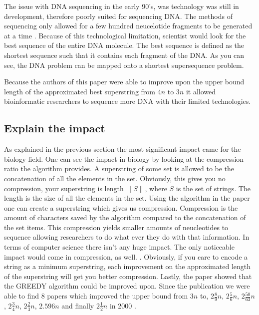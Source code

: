 \documentclass[letterpaper,11pt,titlepage]{article}
\begin{document}
The issue with DNA sequencing in the early 90's, was technology was still in development, therefore poorly suited for sequencing DNA. The methods of sequencing only allowed for a few hundred neucelotide fragments to be generated at a time \cite{karp1993mapping}. Because of this technological limitation, scientist would look for the best sequence of the entire DNA molecule. The best sequence is defined as the shortest sequence such that it contains each fragment of the DNA. As you can see, the DNA problem can be mapped onto a shortest supersequence problem. 

Because the authors of this paper were able to improve upon the upper bound length of the approximated best superstring from $4n$ to $3n$ it allowed bioinformatic researchers to sequence more DNA with their limited technologies. 



\subsection*{Explain the impact}
As explained in the previous section the most significant impact came for the biology field. One can see the impact in biology by looking at the compression ratio the algorithm provides. A superstring of some set is allowed to be the concatenation of all the elements in the set. Obviously, this gives you no compression, your superstring is length $\| S \|$, where $S$ is the set of strings. The length is the size of all the elements in the set. Using the algorithm in the paper one can create a superstring which gives us compression. Compression is the amount of characters saved by the algorithm compared to the concatenation of the set items. This compression yields smaller amounts of neucleotides to sequence allowing researchers to do what ever they do with that information.  In terms of computer science there isn't any huge impact.  The only noticeable impact would come in compression, as well. \cite{storer1988data}. Obviously, if you care to encode a string as a minimum superstring, each improvement on the approximated length of the superstring will get you better compression. Lastly, the paper showed that the GREEDY algorithm could be improved upon. Since the publication we were able to find 8 papers which improved the upper bound from $3n$ to, $2 \frac{8}{9}n$, $2 \frac{5}{6}n$, $2 \frac{50}{63}n$, $2 \frac{3}{4}n$, $2 \frac{2}{3}n$, $2.596n$ and finally $2 \frac{1}{2}n$ in 2000 \cite{sweedyk2000boldmath}.


\newpage
\end{document}
